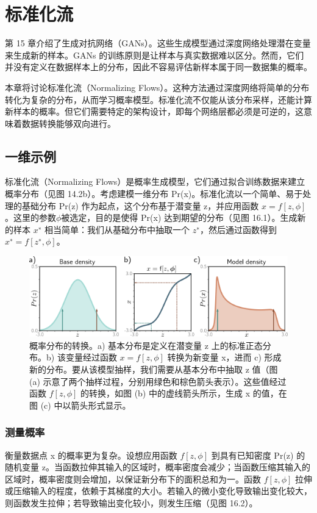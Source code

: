\chapter{标准化流}

第 15 章介绍了生成对抗网络（GANs）。这些生成模型通过深度网络处理潜在变量来生成新的样本。GANs 的训练原则是让样本与真实数据难以区分。然而，它们并没有定义在数据样本上的分布，因此不容易评估新样本属于同一数据集的概率。

本章将讨论标准化流（Normalizing Flows）。这种方法通过深度网络将简单的分布转化为复杂的分布，从而学习概率模型。标准化流不仅能从该分布采样，还能计算新样本的概率。但它们需要特定的架构设计，即每个网络层都必须是可逆的，这意味着数据转换能够双向进行。

\section{一维示例}
标准化流（Normalizing Flows）是概率生成模型，它们通过拟合训练数据来建立概率分布（见图 14.2b）。考虑建模一维分布 Pr(x)。标准化流以一个简单、易于处理的基础分布 Pr(z) 作为起点，这个分布基于潜变量 z，并应用函数 \(x = f[z,\phi]\)。这里的参数\(\phi\)被选定，目的是使得 Pr(x) 达到期望的分布（见图 16.1）。生成新的样本 \(x^∗\) 相当简单：我们从基础分布中抽取一个 \(z^∗\)，然后通过函数得到 \(x^∗ = f[z^∗, \phi]\)。

\begin{figure}[ht!]
\centering
\includegraphics[width=0.7\linewidth]{png/chapter16/FlowIntro.png}
\caption{概率分布的转换。a) 基本分布是定义在潜变量 z 上的标准正态分布。b) 该变量经过函数 \(x = f[z, \phi]\) 转换为新变量 x，进而 c) 形成新的分布。要从该模型抽样，我们需要从基本分布中抽取 z 值（图 (a) 示意了两个抽样过程，分别用绿色和棕色箭头表示）。这些值经过函数 \(f[z, \phi]\) 的转换，如图 (b) 中的虚线箭头所示，生成 x 的值，在图 (c) 中以箭头形式显示。}
\end{figure}

\subsection{测量概率}
衡量数据点 x 的概率更为复杂。设想应用函数 \(f[z, \phi]\) 到具有已知密度 Pr(z) 的随机变量 z。当函数拉伸其输入的区域时，概率密度会减少；当函数压缩其输入的区域时，概率密度则会增加，以保证新分布下的面积总和为一。函数 \(f[z,\phi]\) 拉伸或压缩输入的程度，依赖于其梯度的大小。若输入的微小变化导致输出变化较大，则函数发生拉伸；若导致输出变化较小，则发生压缩（见图 16.2）。

